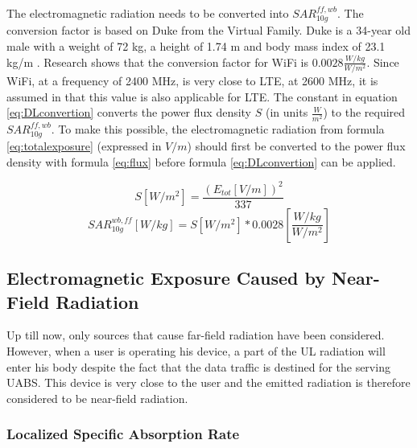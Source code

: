 The electromagnetic radiation needs to be converted into $SAR^{ff,wb}_{10g}$. 
The conversion factor is based on Duke from the Virtual Family. Duke is a 34-year old male with a weight of 72 kg, a height of 1.74 m and body
mass index of 23.1 kg/m \cite{J22_plets2015joint}. Research shows that the conversion factor for WiFi is $0.0028 \frac{W/kg}{W/m^2}$.
 Since WiFi, at a frequency of 2400 MHz,
is very close to LTE, at 2600 MHz, it is assumed in \cite{J22_plets2015joint} that this value is also applicable for \gls{LTE}.
The constant in equation \ref{eq:DLconvertion} converts the \gls{power flux density} $S$ (in units $\frac{W}{m^2}$) to the required $SAR^{ff,wb}_{10g}$.
To make this possible, the electromagnetic radiation
from formula \ref{eq:totalexposure} (expressed in  $V/m$) should first be converted to the  \gls{power flux density} with formula 
\ref{eq:flux} before formula \ref{eq:DLconvertion} can be applied.

\begin{equation}
S [W/m^2]= \frac{(E_{tot} [V/m])^2}{337}
\label{eq:flux}
\end{equation}
\begin{equation}
SAR^{wb,ff}_{10g} [W/kg]= S [W/m^2]* 0.0028  \left[\frac{W/kg}{W/m^2}\right]
\label{eq:DLconvertion}
\end{equation}

\subsection{Electromagnetic Exposure Caused by Near-Field Radiation}
\label{sub:Uplinkexposure}

Up till now, only sources that cause far-field radiation have been considered.
However, when a user is operating his device, a part of the \gls{UL} radiation will enter his body despite the fact 
that the  data traffic is destined for the serving \gls{UABS}. This device is very close to the user and the emitted 
radiation is therefore considered to be near-field radiation.

\subsubsection{Localized Specific Absorption Rate}

